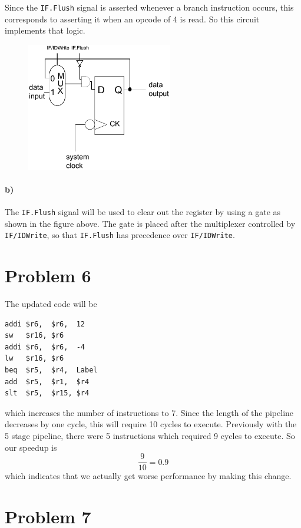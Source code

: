\documentclass[12pt]{article}
\begin{document}
Since the \texttt{IF.Flush} signal is asserted whenever a branch instruction occurs, this corresponds to asserting it when an opcode of 4 is read. So this
circuit implements that logic.

\begin{figure}[!ht]
        \begin{center}
                \includegraphics[width=2.5in]{problem5b.png}
        \end{center}
\end{figure}

\paragraph{b)}

The \texttt{IF.Flush} signal will be used to clear out the register by using a gate as shown in the figure above. The gate is placed after the
multiplexer controlled by \texttt{IF/IDWrite}, so that \texttt{IF.Flush} has precedence over \texttt{IF/IDWrite}.

\section*{Problem 6}

The updated code will be
\begin{verbatim}
addi $r6,  $r6,  12
sw   $r16, $r6
addi $r6,  $r6,  -4
lw   $r16, $r6
beq  $r5,  $r4,  Label
add  $r5,  $r1,  $r4
slt  $r5,  $r15, $r4
\end{verbatim}
which increases the number of instructions to 7. Since the length of the pipeline decreases by one cycle, this will require 10 cycles to execute.
Previously with the 5 stage pipeline, there were 5 instructions which required 9 cycles to execute. So our speedup is
\[\frac{9}{10}=0.9\]
which indicates that we actually get worse performance by making this change.

\section*{Problem 7}
\end{document}
